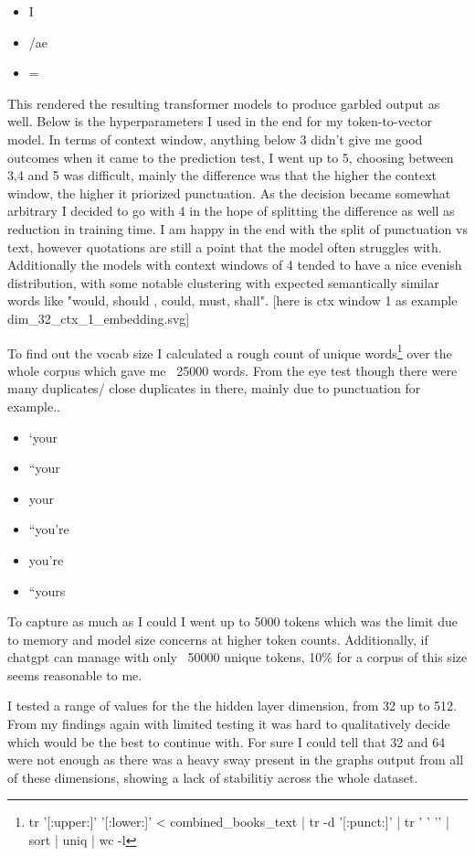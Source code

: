 \documentclass[12pt]{article} \usepackage{COSC420style} \usepackage{soul}
\begin{document}
\begin{itemize}
	\item I
	\item /ae
	\item =
\end{itemize}

This rendered the resulting transformer models to produce garbled output as well.
Below is the hyperparameters I used in the end for my token-to-vector model. In terms of context
window, anything below 3 didn't give me good outcomes when it came to the prediction test, I went up
to 5, choosing between 3,4 and 5 was difficult, mainly the difference was that the higher the
context window, the higher it priorized punctuation. As the decision became somewhat arbitrary I
decided to go with 4 in the hope of splitting the difference as well as reduction in training time.
I am happy in the end with the split of punctuation vs text, however quotations are still a point
that the model often struggles with. Additionally the models with context windows of 4 tended to
have a nice evenish distribution, with some notable clustering with expected semantically similar
words like "would, should , could, must, shall".
[here is ctx window 1 as example dim_32_ctx_1_embedding.svg]

To find out the vocab size I calculated a rough count of unique words\footnote{tr '[:upper:]' '[:lower:]' < combined_books_text | tr -d '[:punct:]' | tr ' ' '\n' | sort
| uniq | wc -l} over the whole corpus which
gave me ~25000 words. From the eye test though there were many duplicates/ close duplicates in
there, mainly due to punctuation for example..

\begin{itemize}
	\item   ‘your
	\item   “your
	\item   your
	\item   “you’re
	\item   you’re
	\item   “yours
\end{itemize}

To capture as much as I could I went up to 5000 tokens which was the limit due to memory and model
size concerns at higher token counts. Additionally, if chatgpt can manage with only ~50000 unique
tokens, 10\% for a corpus of this size seems reasonable to me.

I tested a range of values for the the hidden layer dimension, from 32 up to 512. From my findings
again with limited testing it was hard to qualitatively decide which would be the best to continue
with. For sure I could tell that 32 and 64 were not enough as there was a heavy sway present in the
graphs output from all of these dimensions, showing a lack of stabilitiy across the whole dataset.
\end{document}
